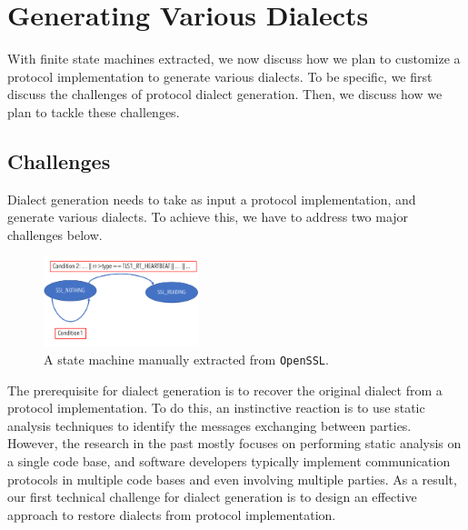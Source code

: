 
\newpage

\section{Generating Various Dialects}
\label{sec:dialect}

With finite state machines extracted, we now discuss how we plan to customize a
protocol implementation to generate various dialects. To be specific, we first
discuss the challenges of protocol dialect generation. Then, we discuss how we
plan to tackle these challenges.

\subsection{Challenges}
\label{sec:task2:challenges}

Dialect generation needs to take as input a protocol implementation, and
generate various dialects. To achieve this, we have to address two major
challenges below.

\begin{figure}
  \centering
  \includegraphics[width=0.4\textwidth]{figure/constraint_tighten}
  \caption{A state machine manually extracted from \texttt{OpenSSL}.}
  \label{fig:tighten}
\end{figure}

 The prerequisite for dialect
generation is to recover the original dialect from a protocol implementation.
To do this, an instinctive reaction is to use static analysis techniques to
identify the messages exchanging between parties. However, the research in the
past mostly focuses on performing static analysis on a single code base, and
software developers typically implement communication protocols in multiple
code bases and even involving multiple parties. As a result, our first
technical challenge for dialect generation is to design an effective approach
to restore dialects from protocol implementation.

